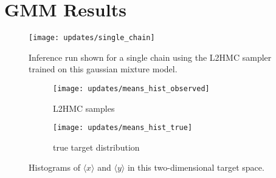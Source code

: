 \section{GMM Results}%
\label{sec:gmm_results}
\begin{figure}[htpb] 
  \centering 
  \texttt{[image: updates/single\_chain]}
  \caption{Inference run shown for a single chain using the L2HMC
  sampler trained on this gaussian mixture model.}%
  \label{fig:gmm_single_chain}
\end{figure}

\begin{figure}[htpb] 
  \centering 
  \begin{subfigure}[t]{0.48\textwidth}
    \caption{L2HMC samples}
    \texttt{[image: updates/means\_hist\_observed]}
  \end{subfigure}
  \begin{subfigure}[t]{0.48\textwidth}
    \caption{true target distribution}
    \texttt{[image: updates/means\_hist\_true]}
  \end{subfigure}
  \caption{Histograms of $\langle x\rangle$ and $\langle y\rangle$ in this
  two-dimensional target space.}
\end{figure}
